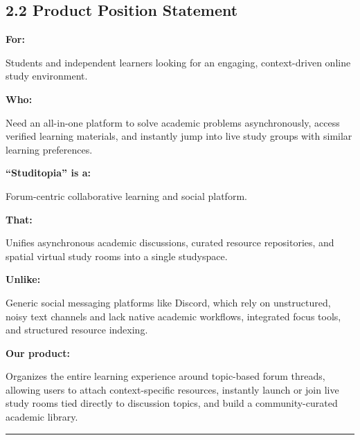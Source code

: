 \documentclass[12pt]{article}
\begin{document}
\subsection*{2.2 Product Position Statement}
\par\medskip
\textbf{For:}
\par\medskip
Students and independent learners looking for an engaging, context-driven online study environment.
\par\medskip
\textbf{Who:}
\par\medskip
Need an all-in-one platform to solve academic problems asynchronously, access verified learning materials, and instantly jump into live study groups with similar learning preferences.
\par\medskip
\textbf{“Studitopia” is a:}
\par\medskip
Forum-centric collaborative learning and social platform.
\par\medskip
\textbf{That:}
\par\medskip
Unifies asynchronous academic discussions, curated resource repositories, and spatial virtual study rooms into a single studyspace.
\par\medskip
\textbf{Unlike:}
\par\medskip
Generic social messaging platforms like Discord, which rely on unstructured, noisy text channels and lack native academic workflows, integrated focus tools, and structured resource indexing.
\par\medskip
\textbf{Our product:}
\par\medskip
Organizes the entire learning experience around topic-based forum threads, allowing users to attach context-specific resources, instantly launch or join live study rooms tied directly to discussion topics, and build a community-curated academic library.
\par\medskip
\par\noindent\rule{\linewidth}{0.4pt}\par\medskip
\hypertarget{sec:3-stakeholder-and-user-descriptions}{}
\end{document}
